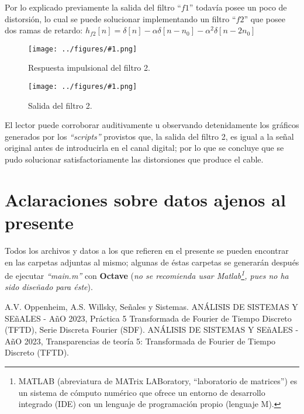 \documentclass[letterpaper, 10 pt, conference]{ieeeconf}  %
\newcommand{\image}[2] {
  \begin{figure}[H]
    \centering
    \texttt{[image: ../figures/\#1.png]}
    \caption{#2}
    \label{fig:#1}
  \end{figure}
}
\begin{document}
Por lo explicado previamente la salida del filtro ``$f1$'' todav\'ia posee un poco de distorsi\'on, lo cual se puede solucionar implementando un filtro ``$f2$'' que posee dos ramas de retardo: $h_{f2}[n] = \delta[n] - \alpha\delta[n-n_0] - \alpha^2\delta[n-2n_0]$ 
\image{h-filtro2}{Respuesta impulsional del filtro 2.}
\image{y-filtro2}{Salida del filtro 2.}

El lector puede corroborar auditivamente u observando detenidamente los gr\'aficos generados por los \textit{``scripts''} provistos que, la salida del filtro 2, es igual a la se\~nal original antes de introducirla en el canal digital; por lo que se concluye que se pudo solucionar satisfactoriamente las distorsiones que produce el cable.

\section{Aclaraciones sobre datos ajenos al presente}
Todos los archivos y datos a los que refieren en el presente se pueden encontrar en las carpetas adjuntas al mismo; algunas de \'estas carpetas se generar\'an despu\'es de ejecutar \textit{``main.m''} con \textbf{Octave} (\textit{no se recomienda usar Matlab\footnote{MATLAB (abreviatura de MATrix LABoratory, ``laboratorio de matrices'') es un sistema de c\'omputo num\'erico que ofrece un entorno de desarrollo integrado (IDE) con un lenguaje de programaci\'on propio (lenguaje M).}, pues no ha sido dise\~nado para \'este}).

\begin{thebibliography}{99}
  
A.V. Oppenheim, A.S. Willsky, Se\~nales y Sistemas.
ANÁLISIS DE SISTEMAS Y SE\~{n}ALES - A\~{n}O 2023, Práctica 5 Transformada de Fourier de Tiempo Discreto (TFTD), Serie Discreta Fourier (SDF).
ANÁLISIS DE SISTEMAS Y SE\~{n}ALES - A\~{n}O 2023, Transparencias de teor\'ia 5: Transformada de Fourier de Tiempo Discreto (TFTD).

\end{thebibliography}
\end{document}
